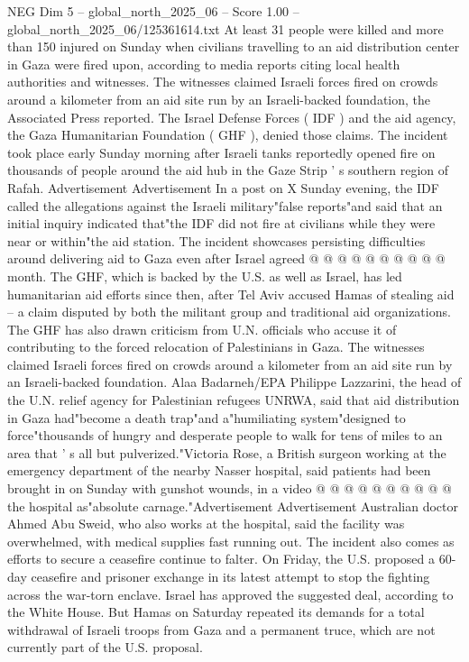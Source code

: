 \begin{textsample}{NEG Dim 5 – global\_north\_2025\_06 – Score 1.00 – global\_north\_2025\_06/125361614.txt}  \label{ex:f5_neg_376}
At least 31 people were killed and more than 150 injured on Sunday when civilians travelling to an aid distribution center in Gaza were fired upon, according to media reports citing local health authorities and witnesses.
The witnesses claimed Israeli forces fired on crowds around a kilometer from an aid site run by an Israeli-backed foundation, the Associated Press reported.
The Israel Defense Forces ( IDF ) and the aid agency, the Gaza Humanitarian Foundation ( GHF ), denied those claims.
The incident took place early Sunday morning after Israeli tanks reportedly opened fire on thousands of people around the aid hub in the Gaze Strip ' s southern region of Rafah.
Advertisement Advertisement In a post on X Sunday evening, the IDF called the allegations against the Israeli military"false reports"and said that an initial inquiry indicated that"the IDF did not fire at civilians while they were near or within"the aid station.
The incident showcases persisting difficulties around delivering aid to Gaza even after Israel agreed @ @ @ @ @ @ @ @ @ @ month.
The GHF, which is backed by the U.S. as well as Israel, has led humanitarian aid efforts since then, after Tel Aviv accused Hamas of stealing aid -- a claim disputed by both the militant group and traditional aid organizations.
The GHF has also drawn criticism from U.N. officials who accuse it of contributing to the forced relocation of Palestinians in Gaza.
The witnesses claimed Israeli forces fired on crowds around a kilometer from an aid site run by an Israeli-backed foundation.
Alaa Badarneh/EPA Philippe Lazzarini, the head of the U.N. relief agency for Palestinian refugees UNRWA, said that aid distribution in Gaza had"become a death trap"and a"humiliating system"designed to force"thousands of hungry and desperate people to walk for tens of miles to an area that ' s all but pulverized."Victoria Rose, a British surgeon working at the emergency department of the nearby Nasser hospital, said patients had been brought in on Sunday with gunshot wounds, in a video @ @ @ @ @ @ @ @ @ @ the hospital as"absolute carnage."Advertisement Advertisement Australian doctor Ahmed Abu Sweid, who also works at the hospital, said the facility was overwhelmed, with medical supplies fast running out.
The incident also comes as efforts to secure a ceasefire continue to falter.
On Friday, the U.S. proposed a 60-day ceasefire and prisoner exchange in its latest attempt to stop the fighting across the war-torn enclave.
Israel has approved the suggested deal, according to the White House.
But Hamas on Saturday repeated its demands for a total withdrawal of Israeli troops from Gaza and a permanent truce, which are not currently part of the U.S. proposal.

\end{textsample}
